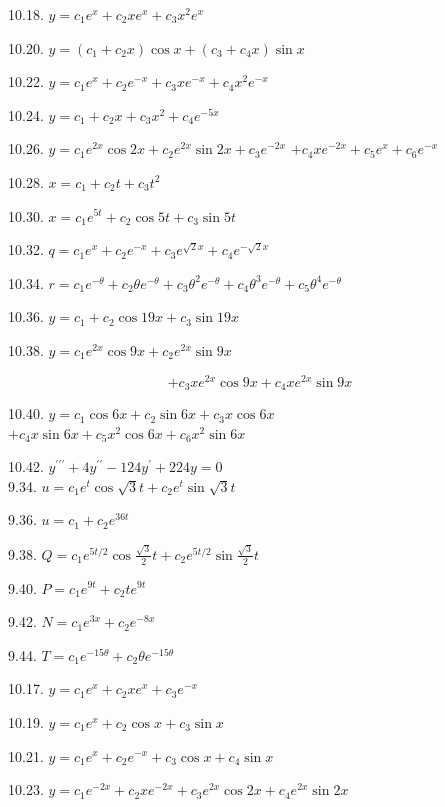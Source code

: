 \documentclass[10pt]{article}
\begin{document}
10.18. $y=c_{1} e^{x}+c_{2} x e^{x}+c_{3} x^{2} e^{x}$

10.20. $y=\left(c_{1}+c_{2} x\right) \cos x+\left(c_{3}+c_{4} x\right) \sin x$

10.22. $y=c_{1} e^{x}+c_{2} e^{-x}+c_{3} x e^{-x}+c_{4} x^{2} e^{-x}$

10.24. $y=c_{1}+c_{2} x+c_{3} x^{2}+c_{4} e^{-5 x}$

10.26. $y=c_{1} e^{2 x} \cos 2 x+c_{2} e^{2 x} \sin 2 x+c_{3} e^{-2 x}$ $+c_{4} x e^{-2 x}+c_{5} e^{x}+c_{6} e^{-x}$

10.28. $x=c_{1}+c_{2} t+c_{3} t^{2}$

10.30. $x=c_{1} e^{5 t}+c_{2} \cos 5 t+c_{3} \sin 5 t$

10.32. $q=c_{1} e^{x}+c_{2} e^{-x}+c_{3} e^{\sqrt{2} x}+c_{4} e^{-\sqrt{2} x}$

10.34. $r=c_{1} e^{-\theta}+c_{2} \theta e^{-\theta}+c_{3} \theta^{2} e^{-\theta}+c_{4} \theta^{3} e^{-\theta}+c_{5} \theta^{4} e^{-\theta}$

10.36. $y=c_{1}+c_{2} \cos 19 x+c_{3} \sin 19 x$

10.38. $y=c_{1} e^{2 x} \cos 9 x+c_{2} e^{2 x} \sin 9 x$

$$
+c_{3} x e^{2 x} \cos 9 x+c_{4} x e^{2 x} \sin 9 x
$$

10.40. $y=c_{1} \cos 6 x+c_{2} \sin 6 x+c_{3} x \cos 6 x$ $+c_{4} x \sin 6 x+c_{5} x^{2} \cos 6 x+c_{6} x^{2} \sin 6 x$

10.42. $y^{\prime \prime \prime}+4 y^{\prime \prime}-124 y^{\prime}+224 y=0$\\
9.34. $u=c_{1} e^{t} \cos \sqrt{3} t+c_{2} e^{t} \sin \sqrt{3} t$

9.36. $u=c_{1}+c_{2} e^{36 t}$

9.38. $Q=c_{1} e^{5 t / 2} \cos \frac{\sqrt{3}}{2} t+c_{2} e^{5 t / 2} \sin \frac{\sqrt{3}}{2} t$

9.40. $P=c_{1} e^{9 t}+c_{2} t e^{9 t}$

9.42. $N=c_{1} e^{3 x}+c_{2} e^{-8 x}$

9.44. $T=c_{1} e^{-15 \theta}+c_{2} \theta e^{-15 \theta}$

10.17. $y=c_{1} e^{x}+c_{2} x e^{x}+c_{3} e^{-x}$

10.19. $y=c_{1} e^{x}+c_{2} \cos x+c_{3} \sin x$

10.21. $y=c_{1} e^{x}+c_{2} e^{-x}+c_{3} \cos x+c_{4} \sin x$

10.23. $y=c_{1} e^{-2 x}+c_{2} x e^{-2 x}+c_{3} e^{2 x} \cos 2 x+c_{4} e^{2 x} \sin 2 x$
\end{document}
